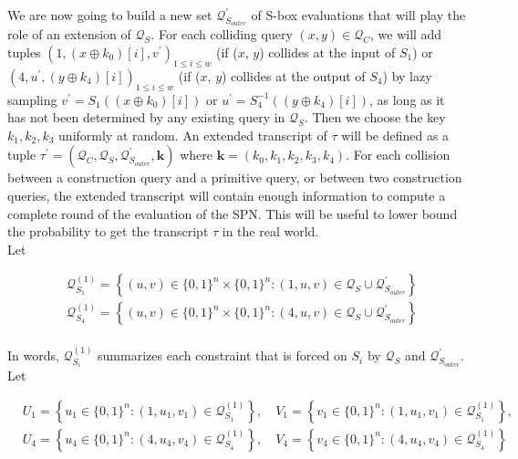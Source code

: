 We are now going to build a new set $\mathcal{Q}_{S_{outer}}^{\prime}$ of S-box evaluations that will play the role of an extension of $\mathcal{Q}_{S}$. For each colliding query $(x, y) \in \mathcal{Q}_{C}$, we will add tuples $\left(1, \left(x \oplus k_{0}\right)[i], v^{\prime}\right)_{1 \leq i \leq w}$ (if ($\mathit{x}$, $\mathit{y}$) collides at the input of $S_1$) or $\left(4, u^{\prime}, \left(y \oplus k_{4}\right)[i]\right)_{1 \leq i \leq w}$ (if ($\mathit{x}$, $\mathit{y}$) collides at the output of $S_4$) by lazy sampling $v^{\prime}=S_{1}(\left(x \oplus k_{0}\right)[i])$ or $u^{\prime}=S_{4}^{-1}(\left(y \oplus k_{4}\right)[i])$, as long as it has not been determined by any existing query in $\mathcal{Q}_{S}$. Then we choose the key $k_1, k_2, k_3$ uniformly at random. An extended transcript of $\tau$ will be defined as a tuple $\tau^{\prime}=\left(\mathcal{Q}_{C}, \mathcal{Q}_{S}, \mathcal{Q}_{S_{outer}}^{\prime}, \mathbf{k}\right)$ where $\mathbf{k}=\left(k_{0}, k_{1}, k_{2},k_{3},k_{4}\right)$. For each collision between a construction query and a primitive query, or between two construction queries, the extended transcript will contain enough information to compute a complete round of the evaluation of the SPN. This will be useful to lower bound the probability to get the transcript $\tau$ in the real world.\\

\noindent Let

$$
\begin{aligned}
&\mathcal{Q}_{S_{1}}^{(1)}=\left\{(u, v) \in\{0,1\}^{n} \times\{0,1\}^{n}:(1, u, v) \in \mathcal{Q}_{S} \cup \mathcal{Q}_{S_{outer}}^{\prime}\right\}\\
&\mathcal{Q}_{S_{4}}^{(1)}=\left\{(u, v) \in\{0,1\}^{n} \times\{0,1\}^{n}:(4, u, v) \in \mathcal{Q}_{S} \cup \mathcal{Q}_{S_{outer}}^{\prime}\right\}\\
\end{aligned}
$$

\noindent In words, $\mathcal{Q}_{S_{i}}^{(1)}$ summarizes each constraint that is forced on $S_{i}$ by $\mathcal{Q}_{S}$ and $\mathcal{Q}_{S_{outer}}^{\prime}$. Let

$$
\begin{aligned}
&U_{1}=\left\{u_{1} \in\{0,1\}^{n}:\left(1, u_{1}, v_{1}\right) \in \mathcal{Q}_{S_{1}}^{(1)}\right\}, \quad V_{1}=\left\{v_{1} \in\{0,1\}^{n}:\left(1, u_{1}, v_{1}\right) \in \mathcal{Q}_{S_{1}}^{(1)}\right\},\\
&U_{4}=\left\{u_{4} \in\{0,1\}^{n}:\left(4, u_{4}, v_{4}\right) \in \mathcal{Q}_{S_{4}}^{(1)}\right\}, \quad V_{4}=\left\{v_{4} \in\{0,1\}^{n}:\left(4, u_{4}, v_{4}\right) \in \mathcal{Q}_{S_{4}}^{(1)}\right\}\\
\end{aligned}
$$

